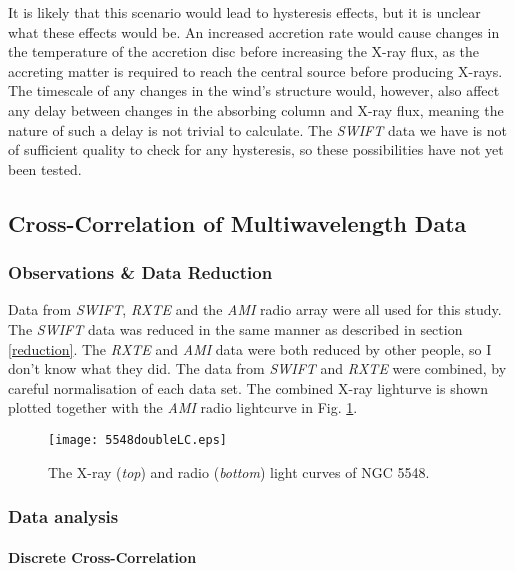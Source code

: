 \documentclass[letters,useAMS,usenatbib]{samnote}
\begin{document}
It is likely that this scenario would lead to hysteresis effects, but it is unclear what these effects would be. An increased accretion rate would cause changes in the
temperature of the accretion disc before increasing the X-ray flux, as the accreting matter is required to reach the central source before producing X-rays. The timescale
of any changes in the wind's structure would, however, also affect any delay between changes in the absorbing column and X-ray flux, meaning the nature of such a delay
is not trivial to calculate. The {\it SWIFT} data we have is not of sufficient quality to check for any hysteresis, so these possibilities have not yet been tested. 

\clearpage

\subsection{Cross-Correlation of Multiwavelength Data}

\subsubsection{Observations \& Data Reduction}

Data from {\it SWIFT}, {\it RXTE} and the {\it AMI} radio array were all used for this study. The {\it SWIFT} data was reduced in the same manner as described in section
\ref{reduction}. The {\it RXTE} and {\it AMI} data were both reduced by other people, so I don't know what they did. The data from {\it SWIFT} and {\it RXTE} were
combined, by careful normalisation of each data set. The combined X-ray lighturve is shown plotted together with the {\it AMI} radio lightcurve in Fig. \ref{twoLCs}. 

\begin{figure}
	
	\texttt{[image: 5548doubleLC.eps]}\hspace{1pt}
	\caption{The X-ray ({\it top}) and radio ({\it bottom}) light curves of NGC 5548.}
	
	\label{twoLCs}
\end{figure}  

\subsubsection{Data analysis}

\paragraph{Discrete Cross-Correlation}
\end{document}
